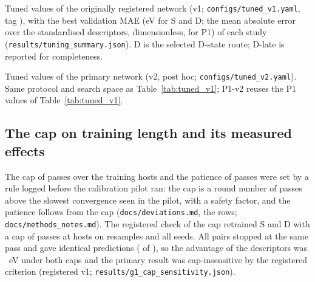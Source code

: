 \begin{table}[htbp]
\caption{Tuned values of the originally registered network (v1; \texttt{configs/tuned\_v1.yaml}, tag \tagtuned{}),
with the best validation MAE (eV for S and D; the mean absolute error over the standardised descriptors,
dimensionless, for P1) of each study (\texttt{results/tuning\_summary.json}). D is the selected D-state route;
D-late is reported for completeness.}
\label{tab:tuned_v1}
\centering\footnotesize\tighttabsb
\begin{adjustbox}{max width=\linewidth}

\end{adjustbox}
\end{table}

\begin{table}[htbp]
\caption{Tuned values of the primary network (v2, post hoc; \texttt{configs/tuned\_v2.yaml}). Same protocol and
search space as Table~\ref{tab:tuned_v1}; P1-v2 reuses the P1 values of Table~\ref{tab:tuned_v1}.}
\label{tab:tuned_v2}
\centering\footnotesize\tighttabsb
\begin{adjustbox}{max width=\linewidth}

\end{adjustbox}
\end{table}

\subsection{The cap on training length and its measured effects}

The cap of \numCfgTrainingMaxEpochs{} passes over the training hosts and the patience of
\numCfgTrainingEarlyStoppingPatience{} passes were set by a rule logged before the calibration pilot ran: the cap
is a round number of passes above the slowest convergence seen in the pilot, with a safety factor, and the
patience follows from the cap (\texttt{docs/deviations.md}, the \sessioncap{} rows; \texttt{docs/methods\_notes.md}). The
registered check of the cap retrained S and D with a cap of \numGOneCapSensitivityCapsItemTwo{} passes at
\numGOneCapSensitivityBudget{} hosts on \numGOneCapSensitivityBootstrapNResamples{} resamples and all seeds. All
\numGOneDiagnosticsEpochCapPairsNPairs{} pairs stopped at the same pass and gave identical predictions
(\numGOneDiagnosticsEpochCapPairsNIdentical{} of \numGOneDiagnosticsEpochCapPairsNPairs{}), so the advantage of the
descriptors was \numGOneCapSensitivityATwoHundredMean{}~eV under both caps
\ci{\numGOneCapSensitivityATwoHundredCiLo{}}{\numGOneCapSensitivityATwoHundredCiHi{}} and the primary result was
cap-insensitive by the registered criterion (registered v1; \texttt{results/g1\_cap\_sensitivity.json}).

